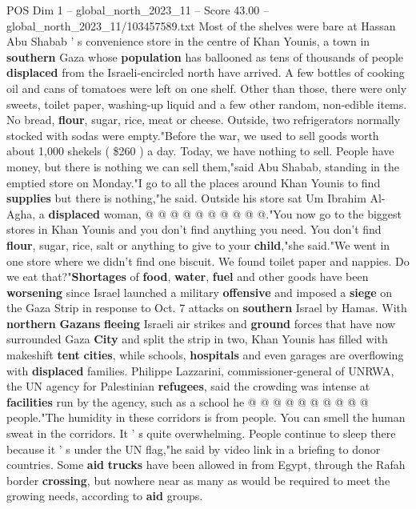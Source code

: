 \begin{textsample}{POS Dim 1 – global\_north\_2023\_11 – Score 43.00 – global\_north\_2023\_11/103457589.txt}  \label{ex:f1_pos_252}
Most of the shelves were bare at Hassan Abu Shabab ' s convenience store in the centre of Khan Younis, a town in \textbf{southern} Gaza whose \textbf{population} has ballooned as tens of thousands of people \textbf{displaced} from the Israeli-encircled north have arrived.
A few bottles of cooking oil and cans of tomatoes were left on one shelf.
Other than those, there were only sweets, toilet paper, washing-up liquid and a few other random, non-edible items.
No bread, \textbf{flour}, sugar, rice, meat or cheese.
Outside, two refrigerators normally stocked with sodas were empty."Before the war, we used to sell goods worth about 1,000 shekels ( \$260 ) a day.
Today, we have nothing to sell.
People have money, but there is nothing we can sell them,"said Abu Shabab, standing in the emptied store on Monday."I go to all the places around Khan Younis to find \textbf{supplies} but there is nothing,"he said.
Outside his store sat Um Ibrahim Al-Agha, a \textbf{displaced} woman, @ @ @ @ @ @ @ @ @ @."You now go to the biggest stores in Khan Younis and you don't find anything you need.
You don't find \textbf{flour}, sugar, rice, salt or anything to give to your \textbf{child},"she said."We went in one store where we didn't find one biscuit.
We found toilet paper and nappies.
Do we eat that?"\textbf{Shortages} of \textbf{food}, \textbf{water}, \textbf{fuel} and other goods have been \textbf{worsening} since Israel launched a military \textbf{offensive} and imposed a \textbf{siege} on the Gaza Strip in response to Oct. 7 attacks on \textbf{southern} Israel by Hamas.
With \textbf{northern} \textbf{Gazans} \textbf{fleeing} Israeli air strikes and \textbf{ground} forces that have now surrounded Gaza \textbf{City} and split the strip in two, Khan Younis has filled with makeshift \textbf{tent} \textbf{cities}, while schools, \textbf{hospitals} and even garages are overflowing with \textbf{displaced} families.
Philippe Lazzarini, commissioner-general of UNRWA, the UN agency for Palestinian \textbf{refugees}, said the crowding was intense at \textbf{facilities} run by the agency, such as a school he @ @ @ @ @ @ @ @ @ @ people."The humidity in these corridors is from people.
You can smell the human sweat in the corridors.
It ' s quite overwhelming.
People continue to sleep there because it ' s under the UN flag,"he said by video link in a briefing to donor countries.
Some \textbf{aid} \textbf{trucks} have been allowed in from Egypt, through the Rafah border \textbf{crossing}, but nowhere near as many as would be required to meet the growing needs, according to \textbf{aid} groups.

\end{textsample}
